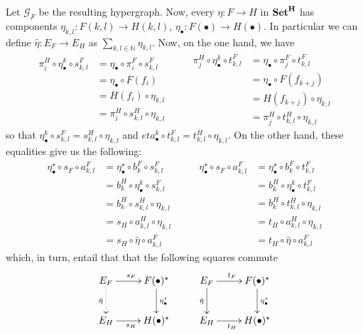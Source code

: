 \documentclass[runningheads,envcountsect]{llncs}
\newcommand{\catname}[1]{\textbf{\textup{#1}}}
\begin{document}
Let $\mathcal{G}_F$ be the resulting hypergraph. Now, every $\eta\colon F\rightarrow H$ in $\catname{Set}^{\catname{H}}$ has components $\eta_{k,l}\colon F(k,l)\to H(k,l)$, $\eta_{\bullet}\colon F(\bullet)\to H(\bullet)$. In particular we can define $\hat{\eta}\colon E_F\rightarrow E_H$ as $\sum_{k,l\in \mathbb{N}}\eta_{k,l}$. Now, on the one hand, we have
\[\begin{split}
	\pi^H_i\circ \eta^k_\bullet \circ  s^F_{k,l}&=\eta_\bullet \circ \pi^F_i \circ s^F_{k,l}\\&=\eta_\bullet \circ F(f_i)\\&=H(f_i)\circ \eta_{k,l}\\&=\pi^H_i\circ s^{H}_{k,l}\circ \eta_{k,l}
\end{split} \qquad \begin{split}
\pi^H_j\circ \eta^k_\bullet \circ  t^F_{k,l}&=\eta_\bullet \circ \pi^F_j \circ t^F_{k,l}\\&=\eta_\bullet \circ F(f_{k+j})\\&=H(f_{k+j})\circ \eta_{k,l}\\&=\pi^H_j\circ t^{H}_{k,l}\circ \eta_{k,l}
\end{split} \]
so that $\eta^k_\bullet \circ  s^F_{k,l}=s^{H}_{k,l}\circ \eta_{k,l}$ and $eta^k_\bullet \circ  t^F_{k,l}= t^{H}_{k,l}\circ \eta_{k,l}$. On the other hand, these equalities give us the following:
\[\begin{split}
	\eta_{\bullet}^\star \circ s_{F}\circ a^F_{k,l}&=\eta_{\bullet}^\star \circ b^F_k\circ s^F_{k,l}\\&=b^H_k\circ \eta^k_{\bullet}\circ s^{F}_{k,l} \\&=b^H_{k}\circ s^H_{k,l}\circ \eta_{k,l}\\&=s_H\circ a^H_{k,l}\circ \eta_{k,l}\\&=	s_H\circ \hat{\eta}\circ a^F_{k,l}
\end{split} \qquad \begin{split}
	\eta_{\bullet}^\star \circ s_{F}\circ a^F_{k,l}&=\eta_{\bullet}^\star \circ b^F_k\circ t^F_{k,l}\\&=b^H_k\circ \eta^k_{\bullet}\circ t^{F}_{k,l} \\&=b^H_{k}\circ t^H_{k,l}\circ \eta_{k,l}\\&=t_H\circ a^H_{k,l}\circ \eta_{k,l}\\&=	t_H\circ \hat{\eta}\circ a^F_{k,l}
\end{split}\]
which, in turn, entail that  that the following squares commute
\[\xymatrix{E_F \ar[r]^{s_F} \ar@{.>}[d]_{\hat{\eta}}& F(\bullet)^\star \ar[d]^{\eta^\star_\bullet} & E_F \ar[r]^{t_F} \ar[d]_{\hat{\eta}} & F(\bullet)^\star \ar[d]^{\eta^\star_\bullet}\\ E_H \ar[r]_{s_H} & H(\bullet)^\star & E_H \ar[r]_{t_H}& H(\bullet)^\star}\]
\end{document}
